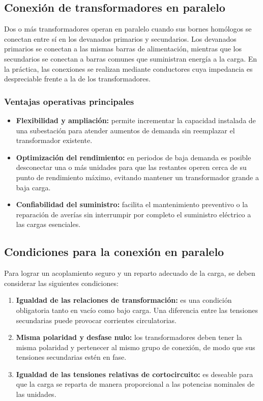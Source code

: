 \documentclass[12pt]{article}
\begin{document}
\subsection{Conexi\'on de transformadores en paralelo}

Dos o m\'as transformadores operan en paralelo cuando sus bornes hom\'ologos se conectan entre s\'i en los devanados primarios y secundarios. Los devanados primarios se conectan a las mismas barras de alimentaci\'on, mientras que los secundarios se conectan a barras comunes que suministran energ\'ia a la carga. En la pr\'actica, las conexiones se realizan mediante conductores cuya impedancia es despreciable frente a la de los transformadores.

\subsubsection{Ventajas operativas principales}
\begin{itemize}
    \item \textbf{Flexibilidad y ampliaci\'on:} permite incrementar la capacidad instalada de una subestaci\'on para atender aumentos de demanda sin reemplazar el transformador existente.
    \item \textbf{Optimizaci\'on del rendimiento:} en periodos de baja demanda es posible desconectar una o m\'as unidades para que las restantes operen cerca de su punto de rendimiento m\'aximo, evitando mantener un transformador grande a baja carga.
    \item \textbf{Confiabilidad del suministro:} facilita el mantenimiento preventivo o la reparaci\'on de aver\'ias sin interrumpir por completo el suministro el\'ectrico a las cargas esenciales.
\end{itemize}

\subsection{Condiciones para la conexi\'on en paralelo}

Para lograr un acoplamiento seguro y un reparto adecuado de la carga, se deben considerar las siguientes condiciones:
\begin{enumerate}
    \item \textbf{Igualdad de las relaciones de transformaci\'on:} es una condici\'on obligatoria tanto en vac\'io como bajo carga. Una diferencia entre las tensiones secundarias puede provocar corrientes circulatorias.
    \item \textbf{Misma polaridad y desfase nulo:} los transformadores deben tener la misma polaridad y pertenecer al mismo grupo de conexi\'on, de modo que sus tensiones secundarias est\'en en fase.
    \item \textbf{Igualdad de las tensiones relativas de cortocircuito:} es deseable para que la carga se reparta de manera proporcional a las potencias nominales de las unidades.
\end{enumerate}
\end{document}
